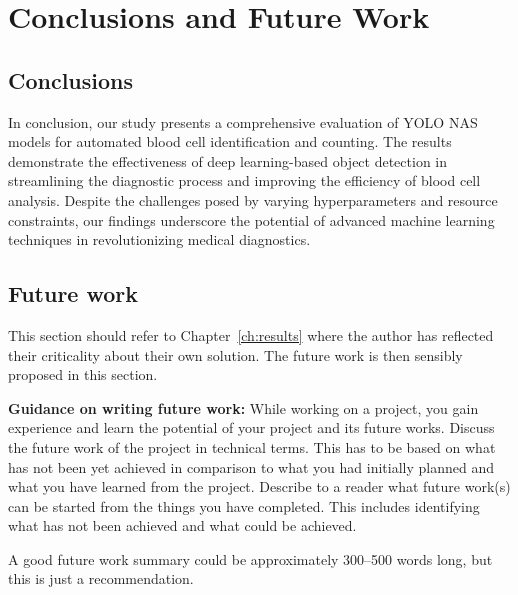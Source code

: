 \chapter{Conclusions and Future Work}
\label{ch:con}
\section{Conclusions}
In conclusion, our study presents a comprehensive evaluation of YOLO NAS models for automated blood cell identification and counting. The results demonstrate the effectiveness of deep learning-based object detection in streamlining the diagnostic process and improving the efficiency of blood cell analysis. Despite the challenges posed by varying hyperparameters and resource constraints, our findings underscore the potential of advanced machine learning techniques in revolutionizing medical diagnostics. 

\section{Future work}
This section should refer to Chapter~\ref{ch:results} where the author has reflected their criticality about their own solution. The future work is then sensibly proposed in this section.

\textbf{Guidance on writing future work:} While working on a project, you gain experience and learn the potential of your project and its future works. Discuss the future work of the project in technical terms. This has to be based on what has not been yet achieved in comparison to what you had initially planned and what you have learned from the project. Describe to a reader what future work(s) can be started from the things you have completed. This includes identifying what has not been achieved and what could be achieved. 



A good future work summary could be approximately 300--500 words long, but this is just a recommendation.
